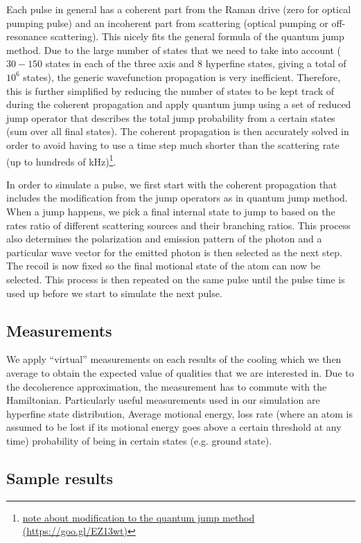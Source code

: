 \documentclass[aps,twocolumn,secnumarabic,balancelastpage,amsmath,amssymb]{revtex4}
\begin{document}
Each pulse in general has a coherent part from the Raman drive (zero for optical pumping pulse)
and an incoherent part from scattering (optical pumping or off-resonance scattering).
This nicely fits the general formula of the quantum jump method. Due to the large number of
states that we need to take into account ($30-150$ states in each of the three axis and
$8$ hyperfine states, giving a total of $10^6$ states),
the generic wavefunction propagation is very inefficient.
Therefore, this is further simplified by reducing the number of states to be kept track of during
the coherent propagation and apply quantum jump using a set of reduced jump operator that
describes the total jump probability from a certain states (sum over all final states).
The coherent propagation is then accurately solved in order to avoid having to use a time step
much shorter than the scattering rate (up to hundreds of kHz)\footnote{\href{https://goo.gl/EZ13wt}{note about modification to the quantum jump method (https://goo.gl/EZ13wt)}}.

In order to simulate a pulse, we first start with the coherent propagation that includes the
modification from the jump operators as in quantum jump method.
When a jump happens, we pick a final internal state to jump to based on the rates ratio
of different scattering sources and their branching ratios.
This process also determines the polarization and emission pattern of the photon and
a particular wave vector for the emitted photon is then selected as the next step.
The recoil is now fixed so the final motional state of the atom can now be selected.
This process is then repeated on the same pulse until the pulse time is used up before
we start to simulate the next pulse.

\subsection{Measurements}

We apply ``virtual'' measurements on each results of the cooling which we then average to
obtain the expected value of qualities that we are interested in.
Due to the decoherence approximation, the measurement has to commute with the Hamiltonian.
Particularly useful measurements used in our simulation are hyperfine state distribution,
Average motional energy, loss rate (where an atom is assumed to be lost if its motional energy
goes above a certain threshold at any time) probability of being in certain states
(e.g. ground state).

\subsection{Sample results}
\end{document}
